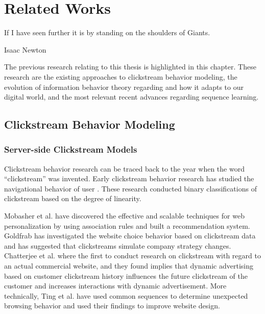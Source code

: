 \section{Related Works}
\label{ch:relate}
\epigraph{If I have seen further it is by standing on the shoulders of Giants.}{Isaac Newton}


The previous research relating to this thesis is highlighted in this chapter. 
These research are the existing approaches to clickstream behavior modeling, 
the evolution of information behavior theory regarding and how it adapts to 
our digital world, and the most relevant recent advances regarding sequence learning.

\subsection{Clickstream Behavior Modeling}

\subsubsection{Server-side Clickstream Models}

Clickstream behavior research can be traced back to the year when the word ``clickstream''
was invented. Early clickstream behavior research has studied the navigational behavior
of user \cite{mandese1995clickstreams, brodwin1995}.
These research conducted binary classifications of clickstream based on the degree of linearity.

Mobasher et al. have discovered the effective and scalable techniques \cite{Mobasher:2001:EPB:502932.502935} 
for web personalization by using association rules and built a recommendation system. 
Goldfrab has investigated \cite{goldfarb2002analyzing} the website choice behavior based on 
clickstream data and has suggested that clickstreams simulate company strategy changes.
Chatterjee et al. \cite{chatterjee2003modeling} where the first to conduct 
research on clickstream with regard to an actual commercial website, 
and they found implies that dynamic advertising
based on customer clickstream history influences the future clickstream of the customer
and increases interactions with dynamic advertisement.
More technically, Ting et al. have used common sequences to determine 
unexpected browsing behavior \cite{Ting:2005:UMF:1092358.1092469}
and used their findings to improve website design. 

